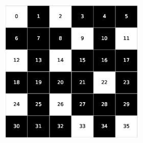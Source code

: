 \begin{figure}[h!]
\begin{subfigure}[b]{\textwidth}
\begin{subfigure}[b]{0.20\textwidth}
        \end{subfigure}
        \hspace{3em}
        \begin{subfigure}[b]{0.20\textwidth}
            \includegraphics[width=\columnwidth]{images/Tai36c_6x6_70.eps}
        \end{subfigure}
     \end{subfigure}
     \caption{Soluzioni delle istanze Tai36c a densità 20\%, 40\% e 70\%}
     \vspace*{1cm}
     \begin{subfigure}[b]{\textwidth}
        \centering
        \begin{subfigure}[b]{0.20\textwidth}

\end{subfigure}
\end{subfigure}
\end{figure}
